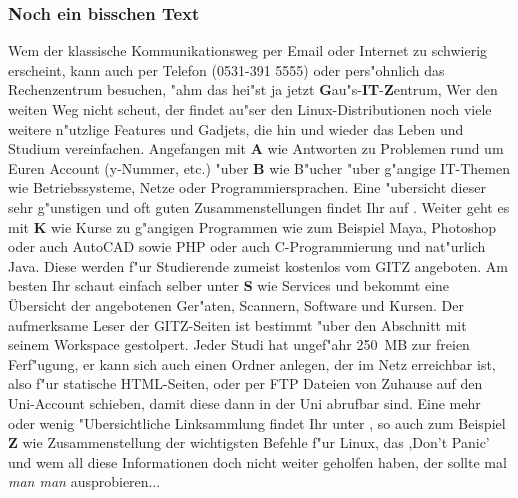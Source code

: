 \subsubsection{Noch ein bisschen Text}
Wem der klassische Kommunikationsweg per Email  oder Internet \mbox{} zu schwierig erscheint, kann auch per Telefon (0531-391 5555) oder pers"ohnlich das Rechenzentrum besuchen, "ahm das hei"st ja jetzt \textbf{G}au"s-\textbf{IT}-\textbf{Z}entrum, Wer den weiten Weg nicht scheut, der findet au"ser den Linux-Distributionen noch viele weitere n"utzlige Features und Gadjets, die hin und wieder das Leben und Studium vereinfachen. Angefangen mit \textbf{A} wie Antworten zu Problemen rund um Euren Account (y-Nummer, etc.)
"uber \textbf{B} wie B"ucher "uber g"angige IT-Themen wie Betriebssysteme, Netze oder Programmiersprachen. Eine "ubersicht dieser sehr g"unstigen und oft guten Zusammenstellungen findet Ihr auf . Weiter geht es mit \textbf{K} wie Kurse  zu g"angigen Programmen wie zum Beispiel Maya, Photoshop oder auch AutoCAD sowie PHP oder auch C-Programmierung und nat"urlich Java. Diese werden f"ur Studierende zumeist kostenlos vom GITZ angeboten. Am besten Ihr schaut einfach selber unter \textbf{S} wie Services  und bekommt eine Übersicht der angebotenen Ger"aten, Scannern, Software und Kursen.\newline
Der aufmerksame Leser der GITZ-Seiten ist bestimmt "uber den Abschnitt mit seinem Workspace gestolpert. Jeder Studi hat ungef"ahr 250~MB zur freien Ferf"ugung, er kann sich auch einen Ordner anlegen, der im Netz erreichbar ist, also f"ur statische HTML-Seiten, oder per FTP Dateien von Zuhause auf den Uni-Account schieben, damit diese dann in der Uni abrufbar sind.\newline
Eine mehr oder wenig "Ubersichtliche Linksammlung findet Ihr unter , so auch zum Beispiel \textbf{Z} wie Zusammenstellung der wichtigsten Befehle f"ur Linux, das ,Don't Panic' 
und wem all diese Informationen doch nicht weiter geholfen haben, der sollte mal \textit{man man} ausprobieren...
